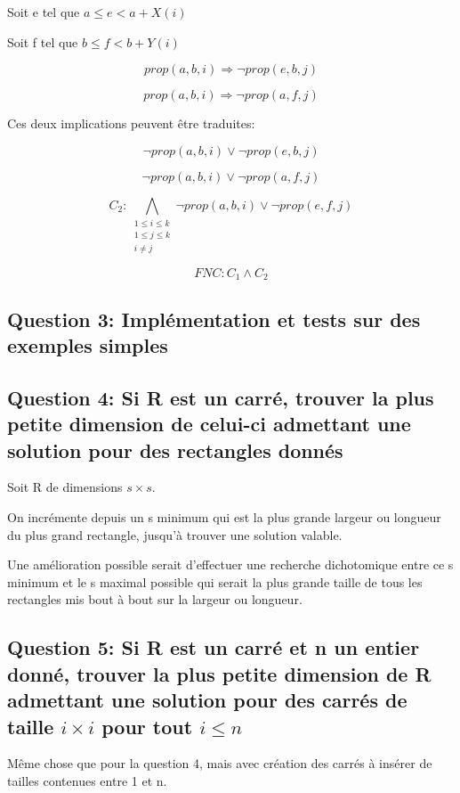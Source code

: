 \documentclass[a4paper,10pt]{article}
\begin{document}
Soit e tel que $a \leq e < a + X(i)$

Soit f tel que $b \leq f < b + Y(i)$

$$prop(a,b,i) \Rightarrow \neg prop(e,b,j)$$

$$prop(a,b,i) \Rightarrow \neg prop(a,f,j)$$

Ces deux implications peuvent être traduites:

$$\neg prop(a,b,i) \lor \neg prop(e,b,j)$$

$$\neg prop(a,b,i) \lor \neg prop(a,f,j)$$

$$C_{2} : \bigwedge_{\substack{1 \leq i \leq k \\ 1 \leq j \leq k \\ i \neq j}} \neg prop(a,b,i) \lor \neg prop(e,f,j)$$


\begin{center}
$$FNC: C_1 \wedge C_2$$
\end{center}

\subsection{Question 3: Implémentation et tests sur des exemples simples}

\subsection{Question 4: Si R est un carré, trouver la plus petite dimension de celui-ci admettant une solution pour des rectangles donnés}

Soit R de dimensions $s \times s$.

On incrémente depuis un s minimum qui est la plus grande largeur ou longueur du plus grand rectangle, jusqu'à trouver une solution valable.

Une amélioration possible serait d'effectuer une recherche dichotomique entre ce s minimum et le s maximal possible qui serait la plus grande taille de tous les rectangles mis bout à bout sur la largeur ou longueur.

\subsection{Question 5: Si R est un carré et n un entier donné, trouver la plus petite dimension de R admettant une solution pour des carrés de taille $i \times i$ pour tout $i \leq n$}

Même chose que pour la question 4, mais avec création des carrés à insérer de tailles contenues entre 1 et n.
\end{document}
